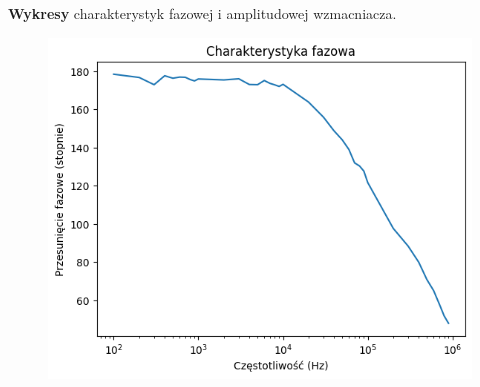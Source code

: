 \documentclass[14pt, table]{extarticle}
\begin{document}
\begin{figure}[H]
    \centering
    \qquad
\end{figure}

\newpage
\textbf{Wykresy} charakterystyk fazowej i amplitudowej wzmacniacza.

\begin{figure}[H]
\includegraphics[scale=0.8]{D1}
\centering
\captionsetup{labelformat=empty}
\caption{}
\end{figure}
\end{document}
